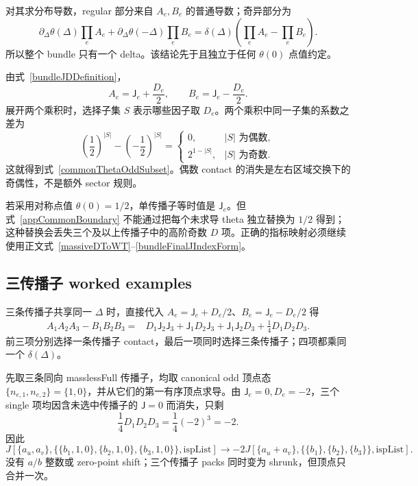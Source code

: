 ﻿\documentclass[a4paper,11pt]{article}
\begin{document}
对其求分布导数，regular 部分来自 $A_e,B_e$ 的普通导数；奇异部分为
\begin{equation}
 \partial_\Delta\theta(\Delta)\prod_eA_e
 +\partial_\Delta\theta(-\Delta)\prod_eB_e
 =\delta(\Delta)\left(\prod_eA_e-\prod_eB_e\right).
 \label{appCommonBoundary}
\end{equation}
所以整个 bundle 只有一个 delta。该结论先于且独立于任何 $\theta(0)$ 点值约定。

由式~\eqref{bundleJDDefinition}，
\begin{equation}
 A_e=\mathsf J_e+\frac{D_e}{2},
 \qquad
 B_e=\mathsf J_e-\frac{D_e}{2}.
\end{equation}
展开两个乘积时，选择子集 $S$ 表示哪些因子取 $D_e$。两个乘积中同一子集的系数之差为
\begin{equation}
 \left(\frac12\right)^{|S|}
 -\left(-\frac12\right)^{|S|}
 =
 \begin{cases}
 0,&|S|\text{ 为偶数},\\
 2^{1-|S|},&|S|\text{ 为奇数}.
 \end{cases}
\end{equation}
这就得到式~\eqref{commonThetaOddSubset}。偶数 contact 的消失是左右区域交换下的奇偶性，不是额外 sector 规则。

若采用对称点值 $\theta(0)=1/2$，单传播子等时值是 $\mathsf J_e$。但式~\eqref{appCommonBoundary} 不能通过把每个未求导 theta 独立替换为 $1/2$ 得到；这种替换会丢失三个及以上传播子中的高阶奇数 $D$ 项。正确的指标映射必须继续使用正文式~\eqref{massiveDToWT}--\eqref{bundleFinalJIndexForm}。

\subsection{三传播子 worked examples}

三条传播子共享同一 $\Delta$ 时，直接代入 $A_e=\mathsf J_e+D_e/2$、$B_e=\mathsf J_e-D_e/2$ 得
\begin{align}
 A_1A_2A_3-B_1B_2B_3
 ={}&D_1\mathsf J_2\mathsf J_3
 +\mathsf J_1D_2\mathsf J_3
 +\mathsf J_1\mathsf J_2D_3
 +\frac14D_1D_2D_3.
 \label{threeLineDirectExpansion}
\end{align}
前三项分别选择一条传播子 contact，最后一项同时选择三条传播子；四项都乘同一个 $\delta(\Delta)$。

先取三条同向 masslessFull 传播子，均取 canonical odd 顶点态 $\{n_{e,1},n_{e,2}\}=\{1,0\}$，并从它们的第一有序顶点求导。由 $\mathsf J_e=0,D_e=-2$，三个 single 项均因含未选中传播子的 $\mathsf J=0$ 而消失，只剩
\begin{equation}
 \frac14D_1D_2D_3=\frac14(-2)^3=-2.
\end{equation}
因此
\begin{equation}
 J\!\left[\{a_u,a_v\},
   \{\{b_1,1,0\},\{b_2,1,0\},\{b_3,1,0\}\},\mathrm{ispList}\right]
 \longrightarrow
 -2J\!\left[\{a_u+a_v\},
   \{\{b_1\},\{b_2\},\{b_3\}\},\mathrm{ispList}\right].
 \label{threeMasslessIndexExample}
\end{equation}
没有 $a/b$ 整数或 zero-point shift；三个传播子 packs 同时变为 shrunk，但顶点只合并一次。
\end{document}

